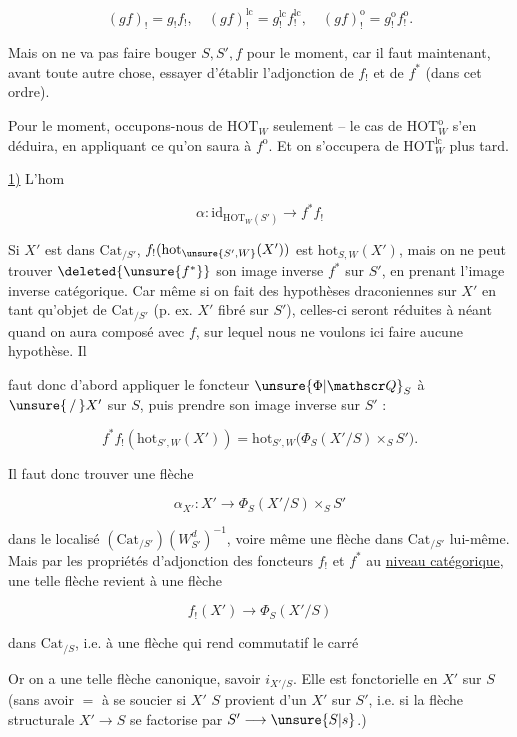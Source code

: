 \[
(gf)_!=g_!f_!,\quad (gf)_!^{\mathrm{lc}}=g_!^{\mathrm{lc}}f_!^{\mathrm{lc}},\quad
(gf)_!^{\mathrm o}=g_!^{\mathrm o}f_!^{\mathrm o}.
\]

Mais on ne va pas faire bouger $S,S',f$ pour le moment, car il faut maintenant, avant toute autre chose, essayer d'établir l'adjonction de $f_!$ et de $f^*$ (dans cet ordre).

Pour le moment, occupons-nous de $\mathrm{HOT}_W$ seulement -- le cas de $\mathrm{HOT}_W^{\mathrm o}$ s'en déduira, en appliquant ce qu'on saura à $f^{\mathrm o}$. Et on s'occupera de $\mathrm{HOT}_W^{\mathrm{lc}}$ plus tard.

\uline{1)} L'hom

\[
\alpha:\mathrm{id}_{\mathrm{HOT}_W(S')}\longrightarrow f^*f_!
\]

Si $X'$ est dans $\mathrm{Cat}_{/S'}$, $f_!(\mathrm{hot}_{\unsure{S',W}}(X'))$ est $\mathrm{hot}_{S,W}(X')$, mais on ne peut trouver $\deleted{\unsure{f^*}}$ son image inverse $f^*$ sur $S'$, en prenant l'image inverse catégorique. Car même si on fait des hypothèses draconiennes sur $X'$ en tant qu'objet de $\mathrm{Cat}_{/S'}$ (p. ex. $X'$ fibré sur $S'$), celles-ci seront réduites à néant quand on aura composé avec $f$, sur lequel nous ne voulons ici faire aucune hypothèse. Il

faut donc d'abord appliquer le foncteur $\unsure{\Phi|\mathscr Q}_S$ à $\unsure{\,/\,}X'$ sur $S$, puis prendre son image inverse sur $S'$ :

\[
f^*f_!(\mathrm{hot}_{S',W}(X'))=\mathrm{hot}_{S',W}\bigl(\Phi_S(X'/S)\times_S S'\bigr).
\]

Il faut donc trouver une flèche

\[
\alpha_{X'}: X'\longrightarrow \Phi_S(X'/S)\times_S S'
\]

dans le localisé $(\mathrm{Cat}_{/S'})(W^d_{S'})^{-1}$, voire même une flèche dans $\mathrm{Cat}_{/S'}$ lui-même. Mais par les propriétés d'adjonction des foncteurs $f_!$ et $f^*$ au \uline{niveau catégorique}, une telle flèche revient à une flèche

\[
f_!(X')\longrightarrow\Phi_S(X'/S)
\]

dans $\mathrm{Cat}_{/S}$, i.e. à une flèche qui rend commutatif le carré


Or on a une telle flèche canonique, savoir $i_{X'/S}$. Elle est fonctorielle en $X'$ sur $S$ (sans avoir $=$ à se soucier si $X'$  $S$ provient d'un $X'$ sur $S'$, i.e. si la flèche structurale $X'\longrightarrow S$ se factorise par $S'\longrightarrow\unsure{S|s}$.)

